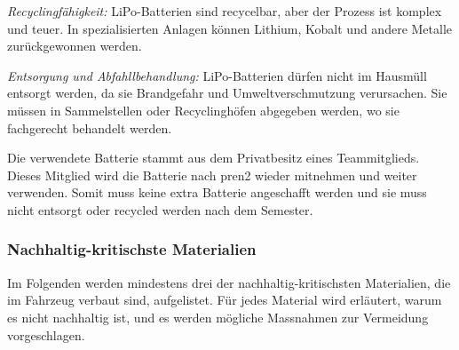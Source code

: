 \textit{Recyclingfähigkeit:} LiPo-Batterien sind recycelbar, aber der Prozess ist komplex und teuer. In spezialisierten Anlagen können Lithium, Kobalt und andere Metalle zurückgewonnen werden.\cite{regan-2023}


\textit{Entsorgung und Abfahllbehandlung:} LiPo-Batterien dürfen nicht im Hausmüll entsorgt
werden, da sie Brandgefahr und Umweltverschmutzung verursachen. Sie müssen in Sammelstellen oder Recyclinghöfen abgegeben werden, wo sie fachgerecht behandelt werden.

Die verwendete Batterie stammt aus dem Privatbesitz eines Teammitglieds. Dieses Mitglied wird die Batterie nach \acrshort{pren2} wieder mitnehmen und weiter verwenden. Somit muss keine extra Batterie angeschafft werden und sie muss nicht entsorgt oder recycled werden nach dem Semester.


\subsubsection{Nachhaltig-kritischste Materialien}
Im Folgenden werden mindestens drei der nachhaltig-kritischsten Materialien, die im Fahrzeug verbaut sind, aufgelistet. Für jedes Material wird erläutert, warum es nicht nachhaltig ist, und es werden mögliche Massnahmen zur Vermeidung vorgeschlagen.

